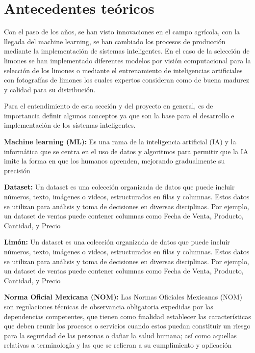 \section{Antecedentes teóricos}

Con el paso de los años, se han visto innovaciones en el campo agrícola, con la llegada del machine learning, se han cambiado los procesos de producción mediante la implementación de sistemas inteligentes. En el caso de la selección de limones se han implementado diferentes modelos por visión computacional para la selección de los limones o mediante el entrenamiento de inteligencias artificiales con fotografías de limones los cuales expertos consideran como de buena madurez y calidad para su distribución.

Para el entendimiento de esta sección y del proyecto en general, es de importancia definir algunos conceptos ya que son la base para el desarrollo e implementación de los sistemas inteligentes.

\textbf{Machine learning (ML):} Es una rama de la inteligencia artificial (IA) y la informática que se centra en el uso de datos y algoritmos para permitir que la IA imite la forma en que los humanos aprenden, mejorando gradualmente su precisión \cite{MachineLearning}

\textbf{Dataset:} Un dataset es una colección organizada de datos que puede incluir números, texto, imágenes o videos, estructurados en filas y columnas. Estos datos se utilizan para análisis y toma de decisiones en diversas disciplinas. Por ejemplo, un dataset de ventas puede contener columnas como Fecha de Venta, Producto, Cantidad, y Precio \cite{Datasets}

\textbf{Limón:} Un dataset es una colección organizada de datos que puede incluir números, texto, imágenes o videos, estructurados en filas y columnas. Estos datos se utilizan para análisis y toma de decisiones en diversas disciplinas. Por ejemplo, un dataset de ventas puede contener columnas como Fecha de Venta, Producto, Cantidad, y Precio \cite{DOF}

\textbf{Norma Oficial Mexicana (NOM):} Las Normas Oficiales Mexicanas (NOM) son regulaciones técnicas de observancia obligatoria expedidas por las dependencias competentes, que tienen como finalidad establecer las características que deben reunir los procesos o servicios cuando estos puedan constituir un riesgo para la seguridad de las personas o dañar la salud humana; así como aquellas relativas a terminología y las que se refieran a su cumplimiento y aplicación \cite{Normas}

